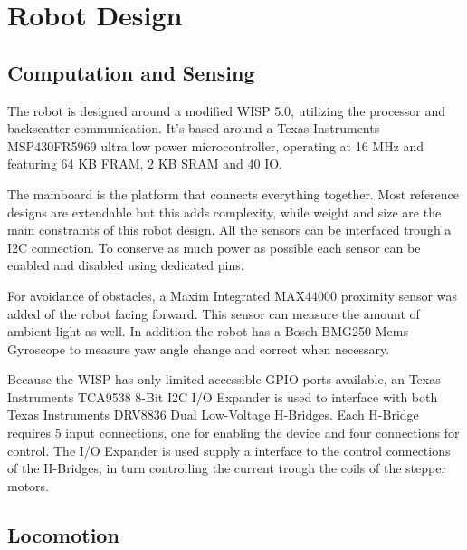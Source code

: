 \documentclass[letterpaper, 10 pt, conference]{ieeeconf}  %
\begin{document}
\section{Robot Design}



\subsection{Computation and Sensing}

The robot is designed around a modified WISP 5.0, utilizing the processor and backscatter communication.
It's based around a Texas Instruments MSP430FR5969 ultra low power microcontroller, operating at 16 MHz and featuring 64 KB FRAM, 2 KB SRAM and 40 IO. 


The mainboard is the platform that connects everything together.
Most reference designs are extendable but this adds complexity, while weight and size are the main constraints of this robot design.
All the sensors can be interfaced trough a I2C connection.
To conserve as much power as possible each sensor can be enabled and disabled using dedicated pins.

For avoidance of obstacles, a Maxim Integrated MAX44000 proximity sensor was added of the robot facing forward.
This sensor can measure the amount of ambient light as well.
In addition the robot has a Bosch BMG250 Mems Gyroscope to measure yaw angle change and correct when necessary.


Because the WISP has only limited accessible GPIO ports available, an Texas Instruments TCA9538 8-Bit I2C I/O Expander is used to interface with both Texas Instruments DRV8836 Dual Low-Voltage H-Bridges.	
Each H-Bridge requires 5 input connections, one for enabling the device and four connections for control.
The I/O Expander is used supply a interface to the control connections of the H-Bridges, in turn controlling the current trough the coils of the stepper motors.

\subsection{Locomotion}
\end{document}
